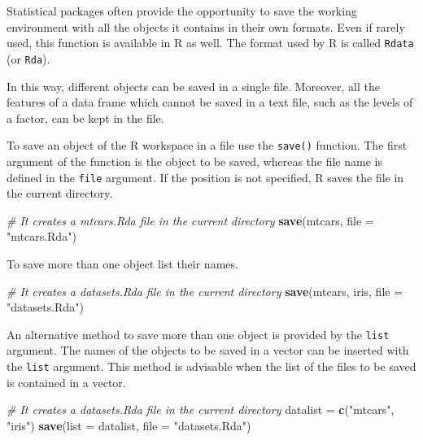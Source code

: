 \documentclass[]{book}
\newenvironment{Shaded}{\begin{snugshade}}{\end{snugshade}}
\newcommand{\KeywordTok}[1]{\textcolor[rgb]{0.13,0.29,0.53}{\textbf{{#1}}}}
\newcommand{\DataTypeTok}[1]{\textcolor[rgb]{0.13,0.29,0.53}{{#1}}}
\newcommand{\StringTok}[1]{\textcolor[rgb]{0.31,0.60,0.02}{{#1}}}
\newcommand{\CommentTok}[1]{\textcolor[rgb]{0.56,0.35,0.01}{\textit{{#1}}}}
\newcommand{\NormalTok}[1]{{#1}}
\begin{document}
Statistical packages often provide the opportunity to save the working
environment with all the objects it contains in their own formats. Even
if rarely used, this function is available in R as well. The format used
by R is called \texttt{Rdata} (or \texttt{Rda}).

In this way, different objects can be saved in a single file. Moreover,
all the features of a data frame which cannot be saved in a text file,
such as the levels of a factor, can be kept in the file.

To save an object of the R workspace in a file use the \texttt{save()}
function. The first argument of the function is the object to be saved,
whereas the file name is defined in the \texttt{file} argument. If the
position is not specified, R saves the file in the current directory.

\begin{Shaded}
\begin{Highlighting}[]
\CommentTok{# It creates a mtcars.Rda file in the current directory}
\KeywordTok{save}\NormalTok{(mtcars, }\DataTypeTok{file =} \StringTok{"mtcars.Rda"}\NormalTok{)}
\end{Highlighting}
\end{Shaded}

To save more than one object list their names.

\begin{Shaded}
\begin{Highlighting}[]
\CommentTok{# It creates a datasets.Rda file in the current directory}
\KeywordTok{save}\NormalTok{(mtcars, iris, }\DataTypeTok{file =} \StringTok{"datasets.Rda"}\NormalTok{)}
\end{Highlighting}
\end{Shaded}

An alternative method to save more than one object is provided by the
\texttt{list} argument. The names of the objects to be saved in a vector
can be inserted with the \texttt{list} argument. This method is
advisable when the list of the files to be saved is contained in a
vector.

\begin{Shaded}
\begin{Highlighting}[]
\CommentTok{# It creates a datasets.Rda file in the current directory}
\NormalTok{datalist =}\StringTok{ }\KeywordTok{c}\NormalTok{(}\StringTok{"mtcars"}\NormalTok{, }\StringTok{"iris"}\NormalTok{)}
\KeywordTok{save}\NormalTok{(}\DataTypeTok{list =} \NormalTok{datalist, }\DataTypeTok{file =} \StringTok{"datasets.Rda"}\NormalTok{)}
\end{Highlighting}
\end{Shaded}
\end{document}

